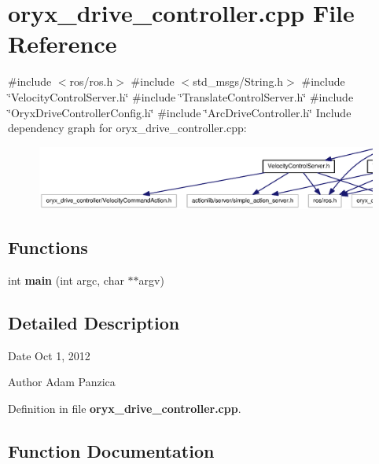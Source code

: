 \section{oryx\-\_\-drive\-\_\-controller.\-cpp \-File \-Reference}
\label{oryx__drive__controller_8cpp}
{\ttfamily \#include $<$ros/ros.\-h$>$}\*
{\ttfamily \#include $<$std\-\_\-msgs/\-String.\-h$>$}\*
{\ttfamily \#include \char`\"{}\-Velocity\-Control\-Server.\-h\char`\"{}}\*
{\ttfamily \#include \char`\"{}\-Translate\-Control\-Server.\-h\char`\"{}}\*
{\ttfamily \#include \char`\"{}\-Oryx\-Drive\-Controller\-Config.\-h\char`\"{}}\*
{\ttfamily \#include \char`\"{}\-Arc\-Drive\-Controller.\-h\char`\"{}}\*
\-Include dependency graph for oryx\-\_\-drive\-\_\-controller.\-cpp\-:
\nopagebreak
\begin{figure}[H]
\begin{center}
\leavevmode
\includegraphics[width=350pt]{oryx__drive__controller_8cpp__incl}
\end{center}
\end{figure}
\subsection*{\-Functions}
\begin{DoxyCompactItemize}
\item 
int {\bf main} (int argc, char $\ast$$\ast$argv)
\end{DoxyCompactItemize}


\subsection{\-Detailed \-Description}
\begin{DoxyDate}{\-Date}
\-Oct 1, 2012 
\end{DoxyDate}
\begin{DoxyAuthor}{\-Author}
\-Adam \-Panzica 
\end{DoxyAuthor}


\-Definition in file {\bf oryx\-\_\-drive\-\_\-controller.\-cpp}.



\subsection{\-Function \-Documentation}
